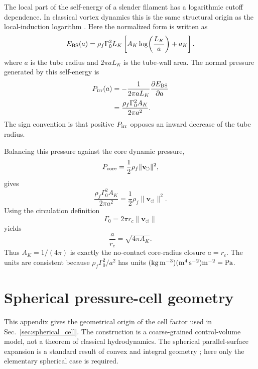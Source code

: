 \documentclass[aps,pra,preprint,longbibliography,nofootinbib]{revtex4-2}
\newcommand{\vnorm}{\lVert\mathbf{v}_{\!\boldsymbol{\circlearrowleft}}\rVert} %
\begin{document}
The local part of the self-energy of a slender filament has a logarithmic
cutoff dependence.  In classical vortex dynamics this is the same structural
origin as the local-induction logarithm \cite{Saffman1992,Batchelor1967}.
Here the normalized form is written as
\begin{equation}
  E_{\rm BS}(a)
  =\rho_f \Gamma_0^2 L_K
   \left[A_K\log\!\left(\frac{L_K}{a}\right)+a_K\right],
  \label{eq:app_bs_energy}
\end{equation}
where $a$ is the tube radius and $2\pi aL_K$ is the tube-wall area.  The
normal pressure generated by this self-energy is
\begin{align}
  P_{\rm irr}(a)
  &=-\frac{1}{2\pi aL_K}\frac{\partial E_{\rm BS}}{\partial a}
    \nonumber\\
  &=\frac{\rho_f\Gamma_0^2A_K}{2\pi a^2}.
  \label{eq:app_pirr}
\end{align}
The sign convention is that positive $P_{\rm irr}$ opposes an inward decrease
of the tube radius.

Balancing this pressure against the core dynamic pressure,
\begin{equation}
  P_{\rm core}=\frac{1}{2}\rho_f\vnorm^2,
  \label{eq:app_pcore}
\end{equation}
gives
\begin{equation}
  \frac{\rho_f\Gamma_0^2 A_K}{2\pi a^2}
  =\frac{1}{2}\rho_f\vnorm^2 .
  \label{eq:app_balance}
\end{equation}
Using the circulation definition
\begin{equation}
  \Gamma_0=2\pi r_c\vnorm
  \label{eq:app_gamma}
\end{equation}
yields
\begin{equation}
  \boxed{\frac{a}{r_c}=\sqrt{4\pi A_K}} .
  \label{eq:app_anc}
\end{equation}
Thus $A_K=1/(4\pi)$ is exactly the no-contact core-radius closure
$a=r_c$.  The units are consistent because
$\rho_f\Gamma_0^2/a^2$ has units
$({\rm kg\,m^{-3}})({\rm m^4\,s^{-2}}){\rm m^{-2}}={\rm Pa}$.

\section{Spherical pressure-cell geometry}
\label{app:spherical_geometry}

This appendix gives the geometrical origin of the cell factor used in
Sec.~\ref{sec:spherical_cell}.  The construction is a coarse-grained
control-volume model, not a theorem of classical hydrodynamics.  The
spherical parallel-surface expansion is a standard result of convex and
integral geometry \cite{Schneider2014}; here only the elementary spherical
case is required.
\end{document}
